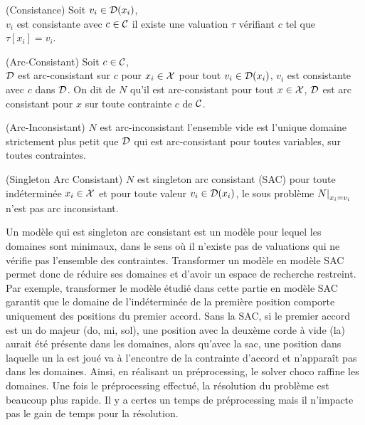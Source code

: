 \begin{defi}(Consistance)
  Soit $v_i\in\mathcal{D}(x_i)$,\\
  $v_i$ est consistante avec $c\in\mathcal{C}$ \ssi il existe une valuation
  $\tau$ vérifiant $c$ tel que $\tau\left[x_i\right]=v_i$.
\end{defi}

\begin{defi}(Arc-Consistant)
  Soit $c\in\mathcal{C}$,\\
  $\mathcal{D}$ est arc-consistant sur $c$ pour
  $x_i\in\mathcal{X}$ \ssi pour tout $v_i\in\mathcal{D}(x_i)$, $v_i$ est
  consistante avec $c$ dans $\mathcal{D}$.
  On dit de $N$ qu'il est arc-consistant \ssi 
  pour tout $x\in\mathcal{X}$, $\mathcal{D}$ est
  arc consistant pour $x$ sur toute contrainte $c$ de $\mathcal{C}$.
\end{defi}

\begin{defi}(Arc-Inconsistant)
  $N$ est arc-inconsistant \ssi l'ensemble vide est l'unique domaine strictement
  plus petit que $\mathcal{D}$ qui est arc-consistant pour toutes variables,
  sur toutes contraintes.
\end{defi}

\begin{defi}(Singleton Arc Consistant)
  $N$ est singleton arc consistant (SAC) \ssi pour toute indéterminée
  $x_i\in\mathcal{X}$ et pour toute valeur $v_i\in\mathcal{D}(x_i)$, le sous
  problème $\restr{N}{x_i=v_i}$ n'est pas arc inconsistant.
\end{defi}

Un modèle qui est singleton arc consistant est un modèle pour lequel les
domaines sont minimaux, dans le sens où il n'existe pas de valuations qui
ne vérifie pas l'ensemble des contraintes.
Transformer un modèle en modèle SAC permet donc de réduire ses domaines et
d'avoir un espace de recherche restreint.
Par exemple, transformer le modèle étudié dans cette partie en modèle SAC 
garantit que le domaine de l'indéterminée de la première position comporte 
uniquement des positions du premier accord.
Sans la SAC, si le premier accord est un do majeur (do, mi, sol), 
une position avec la deuxème corde à vide (la) aurait été présente dans les
domaines, alors qu'avec la sac, une position dans laquelle un la est joué 
va à l'encontre de la contrainte d'accord et n'apparaît pas dans les domaines.
Ainsi, en réalisant un préprocessing, le solver choco raffine les domaines. 
Une fois le préprocessing effectué, la résolution du problème est beaucoup plus
rapide. Il y a certes un temps de préprocessing mais il n'impacte pas le 
gain de temps pour la résolution.

